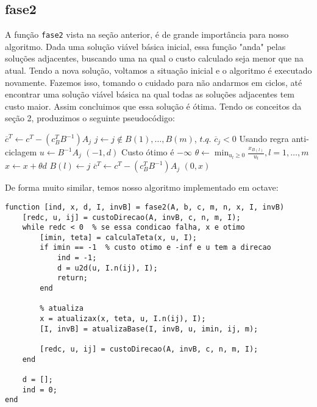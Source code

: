 \documentclass[12pt]{article}
\begin{document}
\subsection{fase2}
	A função \texttt{fase2} vista na seção anterior, é de grande importância para nosso algoritmo. Dada uma solução viável básica inicial, essa função "anda" pelas soluções adjacentes, buscando uma na qual o custo calculado seja menor que na atual. Tendo a nova solução, voltamos a situação inicial e o algoritmo é executado novamente. Fazemos isso, tomando o cuidado para não andarmos em ciclos, até encontrar uma solução viável básica na qual todas as soluções adjacentes tem custo maior. Assim concluimos que essa solução é ótima. Tendo os conceitos da seção 2, produzimos o seguinte pseudocódigo:

\begin{algorithmic}
		\State $\overline{c}^T \gets c^T - (c_B^T B^{-1})A_j$
			\State $j \gets j \not\in {B(1), \dots, B(m)}$, $t.q.$ $\overline{c}_j < 0$ \Comment Usando regra anti-ciclagem
			\State $u \gets B^{-1} A_j$
				\Return $(-1, d)$ \Comment Custo ótimo é $-\infty$
			\EndIf
			\State $\theta \gets \min_{u_l \geq 0} {\frac{x_{B(l)}}{u_l}}, l = 1, \dots, m$
			\State $x \gets x + \theta d$
			\State $B(l) \gets j$
			\State {}
			\State $\overline{c}^T \gets c^T - (c_B^T B^{-1})A_j$
		\EndWhile
		\Return $(0, x)$
	\EndFunction	
\end{algorithmic}

	De forma muito similar, temos nosso algoritmo implementado em octave:
	\begin{lstlisting}
function [ind, x, d, I, invB] = fase2(A, b, c, m, n, x, I, invB)
    [redc, u, ij] = custoDirecao(A, invB, c, n, m, I);
    while redc < 0  % se essa condicao falha, x e otimo
        [imin, teta] = calculaTeta(x, u, I);
        if imin == -1  % custo otimo e -inf e u tem a direcao
            ind = -1;
            d = u2d(u, I.n(ij), I);
            return;
        end

        % atualiza
        x = atualizax(x, teta, u, I.n(ij), I); 
        [I, invB] = atualizaBase(I, invB, u, imin, ij, m);

        [redc, u, ij] = custoDirecao(A, invB, c, n, m, I);
    end
    
    d = [];
    ind = 0;
end 

    \end{lstlisting}
\end{document}
